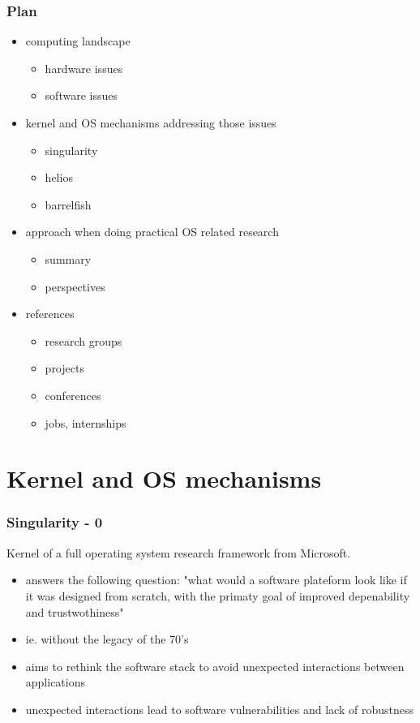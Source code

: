 \begin{frame}
 \frametitle{Plan}

 \begin{itemize}
   \item
     computing landscape
     \begin{itemize}
       \item hardware issues
       \item software issues
     \end{itemize}
   \item
     kernel and OS mechanisms addressing those issues
     \begin{itemize}
       \item singularity
       \item helios
       \item barrelfish
     \end{itemize}
   \item
     approach when doing practical OS related research
     \begin{itemize}
       \item summary
       \item perspectives
     \end{itemize}
   \item
     references
     \begin{itemize}
       \item research groups
       \item projects
       \item conferences
       \item jobs, internships
     \end{itemize}
 \end{itemize}
\end{frame}


%
%

%
%

\section{Kernel and OS mechanisms}


\begin{frame}
  \frametitle{Singularity - 0}

  Kernel of a full operating system research framework from Microsoft.

  \begin{itemize}
    \item answers the following question: "what would a software plateform look like if it was designed from scratch, with the primaty goal of improved depenability and trustwothiness"
    \item ie. without the legacy of the 70's
    \item aims to rethink the software stack to avoid unexpected interactions between applications
    \item unexpected interactions lead to software vulnerabilities and lack of robustness
  \end{itemize}

\end{frame}


